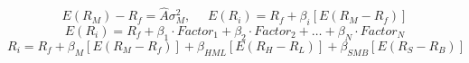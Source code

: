 $$E(R_{M}) - R_{f} = \hat{A}\sigma^{2}_{M}, \,\,\,\,\,\,\,\, E(R_{i}) = R_{f} + \beta_{i}\left[E(R_{M} - R_{f})\right]$$
$$E(R_{i}) = R_{f} + \beta_{1} \cdot Factor_{1} + \beta_{2} \cdot Factor_{2} + \dots +  \beta_{N} \cdot Factor_{N}$$
$$R_{i} = R_{f} + \beta_{M}\left[E(R_{M} - R_{f})\right] + \beta_{HML}\left[E(R_{H} - R_{L})\right] + \beta_{SMB}\left[E(R_{S} - R_{B})\right]$$
